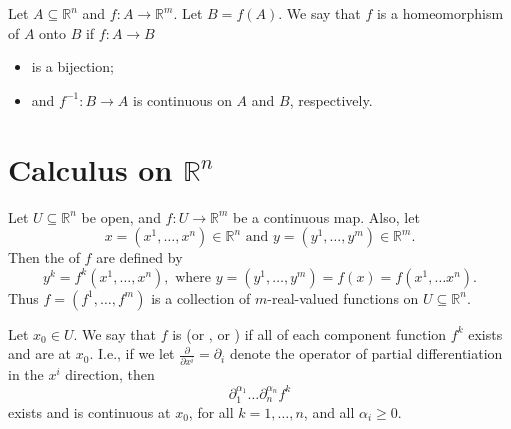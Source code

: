 \documentclass[notoc,notitlepage]{tufte-book}
\begin{document}
\begin{defn}[Homeomorphism]\label{defn:homeomorphism}
  Let $A \subseteq \mathbb{R}^n$ and $f : A \to \mathbb{R}^m$. Let $B = f(A)$. We say that
  $f$ is a homeomorphism of $A$ onto $B$ if $f : A \to B$
  \begin{itemize}
    \item is a bijection;
    \item and $f^{-1} : B \to A$ is continuous on $A$ and $B$, respectively.
  \end{itemize}
\end{defn}


\section{Calculus on \texorpdfstring{$\mathbb{R}^n$}{Rn}}%
\label{sec:calculus_on_r_n_}

Let $U \subseteq \mathbb{R}^n$ be open, and $f : U \to \mathbb{R}^m$ be a
continuous map. Also, let
\begin{equation*}
  x = (x^1, \ldots, x^n) \in \mathbb{R}^n \text{ and }
  y = (y^1, \ldots, y^m) \in \mathbb{R}^m.
\end{equation*}
Then the  of $f$ are defined by
\begin{equation*}
  y^k = f^k(x^1, \ldots, x^n), \text{ where }
  y = (y^1, \ldots, y^m) = f(x) = f(x^1, \ldots x^n).
\end{equation*}
Thus $f = (f^1, \ldots, f^m)$ is a collection of $m$-real-valued functions
on $U \subseteq \mathbb{R}^n$.

\begin{defn}[Smoothness]\label{defn:smoothness}
  Let $x_0 \in U$. We say that $f$ is  (or ,
  or ) if all  of
  each component function $f^k$ exists and are  at $x_0$.
  I.e., if we let $\frac{\partial}{\partial x^i} = \partial_i$ denote the operator
  of partial differentiation in the $x^i$ direction, then
  \begin{equation*}
    \partial_1^{\alpha_1} \hdots \partial_n^{\alpha_n} f^k
  \end{equation*}
  exists and is continuous at $x_0$, for all $k = 1, \ldots, n$,
  and all $\alpha_i \geq 0$.
\end{defn}
\end{document}

